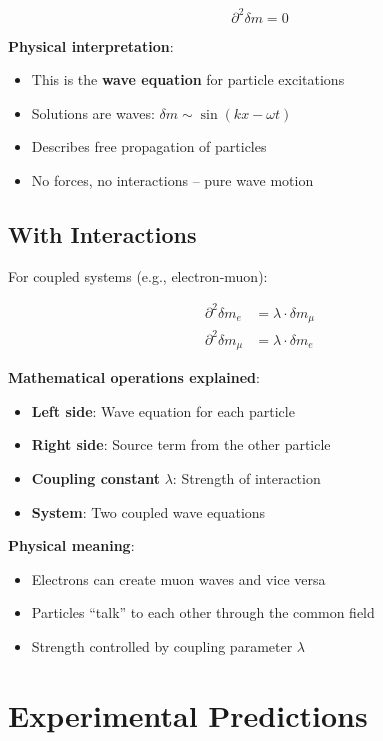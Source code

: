 \documentclass[12pt,a4paper]{article}
\newcommand{\deltam}{\delta m}
\theoremstyle{definition}
\theoremstyle{remark}
\begin{document}
	\begin{equation}
		\boxed{\partial^2 \deltam = 0}
		\label{eq:field_equation}
	\end{equation}
	
	\textbf{Physical interpretation}: 
	\begin{itemize}
		\item This is the \textbf{wave equation} for particle excitations
		\item Solutions are waves: $\deltam \sim \sin(kx - \omega t)$
		\item Describes free propagation of particles
		\item No forces, no interactions -- pure wave motion
	\end{itemize}
	
	\subsection{With Interactions}
	
	For coupled systems (e.g., electron-muon):
	
	\begin{align}
		\partial^2 \deltam_e &= \lambda \cdot \deltam_{\mu} \\
		\partial^2 \deltam_{\mu} &= \lambda \cdot \deltam_e
	\end{align}
	
	\textbf{Mathematical operations explained}:
	\begin{itemize}
		\item \textbf{Left side}: Wave equation for each particle
		\item \textbf{Right side}: Source term from the other particle
		\item \textbf{Coupling constant} $\lambda$: Strength of interaction
		\item \textbf{System}: Two coupled wave equations
	\end{itemize}
	
	\textbf{Physical meaning}:
	\begin{itemize}
		\item Electrons can create muon waves and vice versa
		\item Particles ``talk'' to each other through the common field
		\item Strength controlled by coupling parameter $\lambda$
	\end{itemize}
	
	\section{Experimental Predictions}
	
\end{document}
